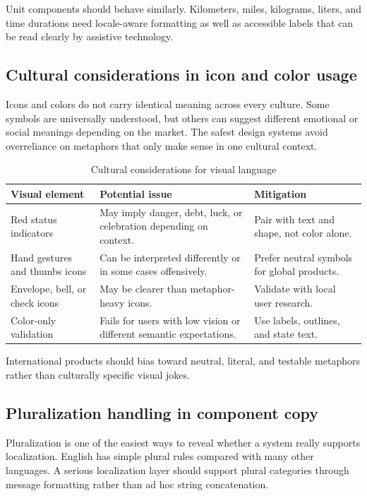 Unit components should behave similarly. Kilometers, miles, kilograms, liters, and time durations need locale-aware formatting as well as accessible labels that can be read clearly by assistive technology.

\subsection{Cultural considerations in icon and color usage}
Icons and colors do not carry identical meaning across every culture. Some symbols are universally understood, but others can suggest different emotional or social meanings depending on the market. The safest design systems avoid overreliance on metaphors that only make sense in one cultural context.

\begin{table}[htbp]
  \centering
  \caption{Cultural considerations for visual language}
  \begin{tabularx}{\textwidth}{@{}p{}p{}Y@{}}
    \toprule
    \textbf{Visual element} & \textbf{Potential issue} & \textbf{Mitigation} \\
    \midrule
    Red status indicators & May imply danger, debt, luck, or celebration depending on context. & Pair with text and shape, not color alone. \\
    Hand gestures and thumbs icons & Can be interpreted differently or in some cases offensively. & Prefer neutral symbols for global products. \\
    Envelope, bell, or check icons & May be clearer than metaphor-heavy icons. & Validate with local user research. \\
    Color-only validation & Fails for users with low vision or different semantic expectations. & Use labels, outlines, and state text. \\
    \bottomrule
  \end{tabularx}
\end{table}

International products should bias toward neutral, literal, and testable metaphors rather than culturally specific visual jokes.

\subsection{Pluralization handling in component copy}
Pluralization is one of the easiest ways to reveal whether a system really supports localization. English has simple plural rules compared with many other languages. A serious localization layer should support plural categories through message formatting rather than ad hoc string concatenation.

